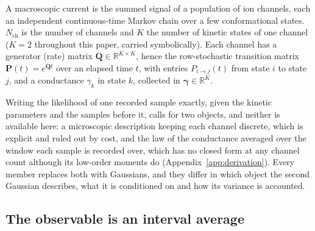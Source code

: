 A macroscopic current is the summed signal of a population of ion channels, each an
independent continuous-time Markov chain over a few conformational states. $N_{\mathrm{ch}}$
is the number of channels and $K$ the number of kinetic states of one channel ($K=2$ %
throughout this paper, carried symbolically). Each channel has a generator (rate) matrix
$\mathbf{Q}\in\mathbb{R}^{K\times K}$, hence the row-stochastic transition matrix
$\mathbf{P}(t)=e^{\mathbf{Q}t}$ over an elapsed time $t$, with entries $P_{i\to j}(t)$ from
state $i$ to state $j$, and a conductance $\gamma_k$ in state $k$, collected in
$\boldsymbol{\gamma}\in\mathbb{R}^{K}$.

Writing the likelihood of one recorded sample exactly, given the kinetic parameters and the
samples before it, calls for two objects, and neither is available here: a microscopic
description keeping each channel discrete, which is explicit and ruled out by cost, and the law
of the conductance averaged over the window each sample is recorded over, which has no closed
form at any channel count although its low-order moments do (Appendix~\ref{app:derivation}). Every member
replaces both with Gaussians, and they differ in which object the second Gaussian describes, what
it is conditioned on and how its variance is accounted.

\subsection*{The observable is an interval average}

